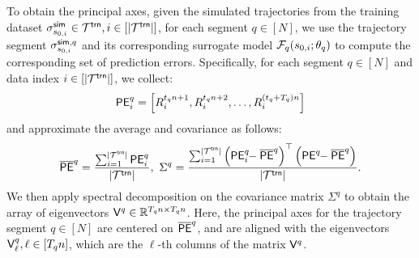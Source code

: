 To obtain the principal axes, given the simulated trajectories from the training dataset $\sigma^{\mathsf{sim}}_{s_{0,i}} \in \mathcal{T}^{\mathsf{trn}}, i\in [|\mathcal{T}^{\mathsf{trn}}|]$, for each segment $q\in[N]$, we use the trajectory segment $\sigma^{\mathsf{sim} , q}_{s_{0,i}}$ and its corresponding surrogate model $\mathcal{F}_q(s_{0,i}; \theta_q)$ to compute the corresponding set of prediction errors. Specifically, for each segment $q\in [N]$ and data index $i\in[|\mathcal{T}^{\mathsf{trn}}|]$, we collect: 
\begin{equation}
\mathsf{PE}^{q}_i = \left[ R^{t_q n+1}_i, R^{t_q n+2}_i, \ldots, R^{(t_q+T_q)n}_i \right]
\end{equation}
and approximate the average and covariance as follows:
\begin{equation}
\navid{\overline{\PE}^{q}} = \frac{\sum_{i=1}^{|\traindataset|} \PEsimseg{q}_i}{|\traindataset|} , \ \Sigma^q = \frac{\sum_{i=1}^{|\traindataset|} \left(\PEsimseg{q}_i \!\!- \overline{\PE}^{q}\right)^\top \left(\PEsimseg{q} \!\!- \overline{\PE}^{q}\right)}{|\traindataset|}.    
\end{equation}
We then apply spectral decomposition on the covariance matrix $\Sigma^q$ to obtain the array of eigenvectors $\mathsf{V}^{ q} \in \mathbb{R}^{T_q n \times T_q n}$. Here, the principal axes for the trajectory segment $q \in [N]$ are centered on $\overline{\mathsf{PE}}^{q}$, and are aligned with the eigenvectors $\mathsf{V}^{ q}_\ell, \ell \in [T_q n]$, which are the $\ell$-th columns of the matrix $\mathsf{V}^{ q}$.

